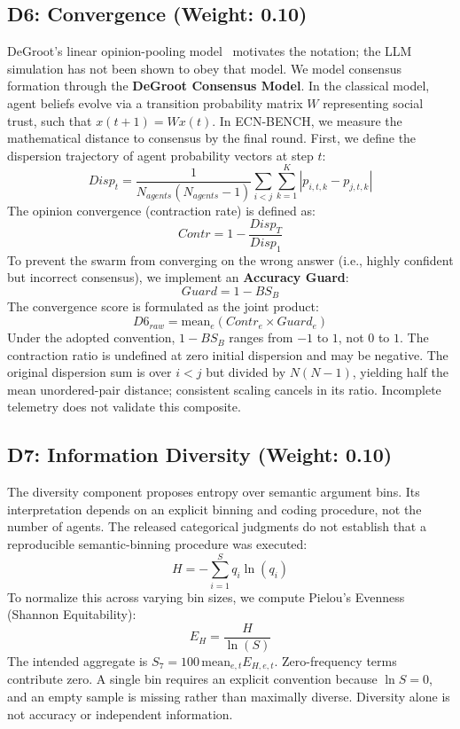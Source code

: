 \subsection{D6: Convergence (Weight: 0.10)}
DeGroot's linear opinion-pooling model~\cite{degroot1974} motivates the notation; the LLM simulation has not been shown to obey that model.
We model consensus formation through the \textbf{DeGroot Consensus Model}. In the classical model, agent beliefs evolve via a transition probability matrix $W$ representing social trust, such that $x(t+1) = W x(t)$. In ECN-BENCH, we measure the mathematical distance to consensus by the final round. First, we define the dispersion trajectory of agent probability vectors at step $t$:
\begin{equation}
    Disp_t = \frac{1}{N_{agents}(N_{agents}-1)} \sum_{i < j} \sum_{k=1}^K |p_{i,t,k} - p_{j,t,k}|
\end{equation}
The opinion convergence (contraction rate) is defined as:
\begin{equation}
    Contr = 1 - \frac{Disp_{T}}{Disp_{1}}
\end{equation}
To prevent the swarm from converging on the wrong answer (i.e., highly confident but incorrect consensus), we implement an \textbf{Accuracy Guard}:
\begin{equation}
    Guard = 1 - BS_B
\end{equation}
The convergence score is formulated as the joint product:
\begin{equation}
    D6_{raw} = \text{mean}_e (Contr_e \times Guard_e)
\end{equation}
Under the adopted convention, $1-BS_B$ ranges from $-1$ to $1$, not $0$ to $1$. The contraction ratio is undefined at zero initial dispersion and may be negative. The original dispersion sum is over $i<j$ but divided by $N(N-1)$, yielding half the mean unordered-pair distance; consistent scaling cancels in its ratio. Incomplete telemetry does not validate this composite.

\subsection{D7: Information Diversity (Weight: 0.10)}
The diversity component proposes entropy over semantic argument bins. Its interpretation depends on an explicit binning and coding procedure, not the number of agents. The released categorical judgments do not establish that a reproducible semantic-binning procedure was executed:
\begin{equation}
    H = - \sum_{i=1}^S q_i \ln(q_i)
\end{equation}
To normalize this across varying bin sizes, we compute Pielou's Evenness (Shannon Equitability):
\begin{equation}
    E_H = \frac{H}{\ln(S)}
\end{equation}
The intended aggregate is $S_7=100\,\mathrm{mean}_{e,t}E_{H,e,t}$. Zero-frequency terms contribute zero. A single bin requires an explicit convention because $\ln S=0$, and an empty sample is missing rather than maximally diverse. Diversity alone is not accuracy or independent information.

